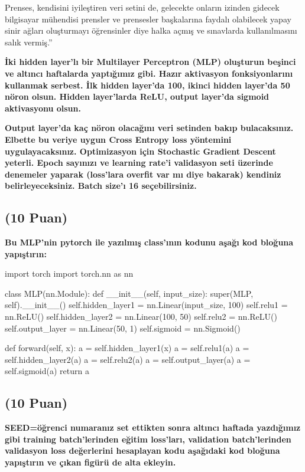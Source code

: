 \documentclass[11pt]{article}
\begin{document}
Prenses, kendisini iyileştiren veri setini de, gelecekte onların izinden gidecek bilgisayar mühendisi prensler ve prensesler başkalarına faydalı olabilecek yapay sinir ağları oluşturmayı öğrensinler diye halka açmış ve sınavlarda kullanılmasını salık vermiş.''

\textbf{İki hidden layer'lı bir Multilayer Perceptron (MLP) oluşturun beşinci ve altıncı haftalarda yaptığımız gibi. Hazır aktivasyon fonksiyonlarını kullanmak serbest. İlk hidden layer'da 100, ikinci hidden layer'da 50 nöron olsun. Hidden layer'larda ReLU, output layer'da sigmoid aktivasyonu olsun.}

\textbf{Output layer'da kaç nöron olacağını veri setinden bakıp bulacaksınız. Elbette bu veriye uygun Cross Entropy loss yöntemini uygulayacaksınız. Optimizasyon için Stochastic Gradient Descent yeterli. Epoch sayınızı ve learning rate'i validasyon seti üzerinde denemeler yaparak (loss'lara overfit var mı diye bakarak) kendiniz belirleyeceksiniz. Batch size'ı 16 seçebilirsiniz.}

\subsection{(10 Puan)} \textbf{Bu MLP'nin pytorch ile yazılmış class'ının kodunu aşağı kod bloğuna yapıştırın:}

\begin{python}
import torch
import torch.nn as nn

class MLP(nn.Module):
    def __init__(self, input_size):
        super(MLP, self).__init__()
        self.hidden_layer1 = nn.Linear(input_size, 100)
        self.relu1 = nn.ReLU()
        self.hidden_layer2 = nn.Linear(100, 50)
        self.relu2 = nn.ReLU()
        self.output_layer = nn.Linear(50, 1)
        self.sigmoid = nn.Sigmoid()

    def forward(self, x):
        a = self.hidden_layer1(x)
        a = self.relu1(a)
        a = self.hidden_layer2(a)
        a = self.relu2(a)
        a = self.output_layer(a)
        a = self.sigmoid(a)
        return a
\end{python}

\subsection{(10 Puan)} \textbf{SEED=öğrenci numaranız set ettikten sonra altıncı haftada yazdığımız gibi training batch'lerinden eğitim loss'ları, validation batch'lerinden validasyon loss değerlerini hesaplayan kodu aşağıdaki kod bloğuna yapıştırın ve çıkan figürü de alta ekleyin.}
\end{document}
